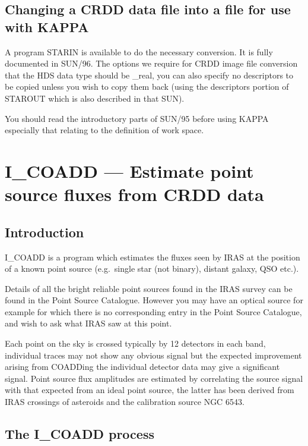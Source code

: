 \subsection{Changing a CRDD data file into a file for use with KAPPA}

A program STARIN is available to do the necessary conversion. It is fully
documented in SUN/96. The options we require for CRDD image file conversion
that the HDS data type should be \_real, you can also specify no descriptors to
be copied unless you wish to copy them back (using the descriptors portion of
STAROUT which is also described in that SUN).

You should read the introductory parts of SUN/95 before using KAPPA especially
that relating to the definition of work space.

\pagebreak

\section{I\_COADD --- Estimate point source fluxes from CRDD data}

\subsection{Introduction}

I\_COADD is a program which estimates the fluxes seen by IRAS at the position 
of a known point source (e.g.\ single star (not binary), distant galaxy, QSO
etc.). 

Details of all the bright reliable point sources found in the IRAS survey can 
be found in the Point Source Catalogue. However you may have an optical source
for example for which there is no corresponding entry in the Point Source
Catalogue, and wish to ask what IRAS saw at this point.


Each point on the sky is crossed typically by 12 detectors in each band,
individual traces may not show any obvious signal but the expected improvement
arising from COADDing the individual detector data may give a significant
signal. Point source flux amplitudes are estimated by correlating the source
signal with that expected from an ideal point source, the latter has been
derived from IRAS crossings of asteroids and the calibration source NGC 6543.

\subsection{The I\_COADD process}


